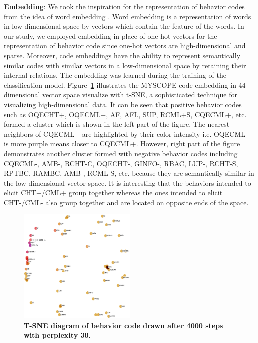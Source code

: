 \documentclass{amia_summit_2018}
\begin{document}
\textbf {Embedding}: We took the inspiration for the representation of behavior codes from the idea of word embedding \cite{bengio2003neural}. Word embedding is a representation of words in low-dimensional space by vectors which contain the feature of the words. In our study, we employed embedding in place of one-hot vectors for the representation of behavior code since one-hot vectors are high-dimensional and sparse. Moreover, code embeddings have the ability to represent semantically similar codes with similar vectors in a low-dimensional space by retaining their internal relations. The embedding was learned during the training of the classification model. Figure~\ref{fig:code_embedding} illustrates the MYSCOPE code embedding in 44-dimensional vector space visualize with t-SNE, a sophisticated technique for visualizing high-dimensional data. It can be seen that positive behavior codes such as OQECHT+, OQECML+, AF, AFL, SUP, RCML+S, CQECML+, etc. formed a cluster which is shown in the left part of the figure. The nearest neighbors of CQECML+ are highlighted by their color intensity i.e. OQECML+ is more purple means closer to CQECML+. However, right part of the figure demonstrates another cluster formed with negative behavior codes including CQECML-, AMB-, RCHT-C, OQECHT-, GINFO-, RBAC, LUP-, RCHT-S, RPTBC, RAMBC, AMB-, RCML-S, etc. because they are semantically similar in the low dimensional vector space. It is interesting that the behaviors intended to elicit CHT+/CML+ group together whereas the ones intended to elicit CHT-/CML- also group together and are located on opposite ends of the space. 
    
\begin{figure}[!htb]
    \centering
    \includegraphics[width=0.50\textwidth]{figures/code_embed.eps}
    \caption{\textbf{T-SNE diagram of behavior code drawn after 4000 steps with perplexity 30}.}
    \label{fig:code_embedding}
\end{figure}
\end{document}
